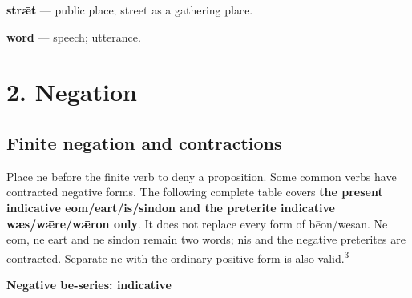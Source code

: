 \textbf{strǣt} — public place; street as a gathering place.

\textbf{word} — speech; utterance.

\section*{2. Negation}

\subsection*{Finite negation and contractions}

Place ne before the finite verb to deny a proposition. Some common verbs have contracted negative forms. The following complete table covers \textbf{the present indicative eom/\allowbreak{}eart/\allowbreak{}is/\allowbreak{}sindon and the preterite indicative wæs/\allowbreak{}wǣre/\allowbreak{}wǣron only}. It does not replace every form of bēon/\allowbreak{}wesan. Ne eom, ne eart and ne sindon remain two words; nis and the negative preterites are contracted. Separate ne with the ordinary positive form is also valid.\textsuperscript{3}

\textbf{Negative be-series: indicative}


